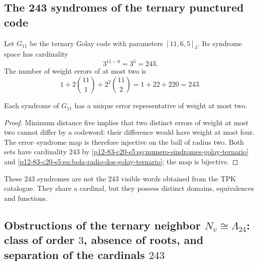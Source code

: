 \subsection{The 243 syndromes of the ternary punctured code}

Let \(G_{11}\) be the ternary Golay code with parameters
\([11,6,5]_3\). Its syndrome space has cardinality
\begin{equation}
 3^{11-6}=3^5=243.
 \label{p12-83-c20-s5:eq:numero-sindromes-golay-ternario}
\end{equation}
The number of weight errors of at most two is
\begin{equation}
 1+2\binom{11}{1}+2^2\binom{11}{2}
 =1+22+220=243.
 \label{p12-83-c20-s5:eq:bola-radio-dos-golay-ternario}
\end{equation}

\begin{proposition}
\label{p12-83-c20-s5:prop:correspondencia-error-sindrome-golay}
Each syndrome of \(G_{11}\) has a unique error representative of weight at most two.
\end{proposition}

\begin{proof}
Minimum distance five implies that two distinct errors of weight at
most two cannot differ by a codeword: their difference would have
weight at most four. The error--syndrome map is therefore
injective on the ball of radius two. Both sets have cardinality
\(243\) by \eqref{p12-83-c20-s5:eq:numero-sindromes-golay-ternario} and
\eqref{p12-83-c20-s5:eq:bola-radio-dos-golay-ternario}; the map is bijective.
\end{proof}

These \(243\) syndromes are not the \(243\) visible words obtained from the
TPK catalogue. They share a cardinal, but they possess distinct domains, equivalences and
functions.

\subsection{Obstructions of the ternary neighbor \(N_v\cong\Lambda_{24}\): class of order \(3\), absence of roots, and separation of the cardinals \(243\)}


